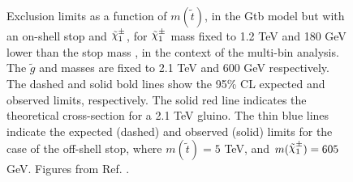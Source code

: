 \begin{figure}
  \centering
  \caption{Exclusion limits as a function of $m(\tilde{t})$, in the Gtb model but with an on-shell stop and $\chinoonepm$, 
  for $\chinoonepm$ mass fixed to 1.2 TeV  and 180 GeV lower than the stop mass ,
  in the context of the multi-bin analysis. The $\tilde{g}$ and \ninoone masses are fixed to 2.1 TeV and 600 GeV respectively.   
  The dashed and solid bold lines  show the 95\% CL expected and observed limits, respectively.    
  The solid red line indicates the theoretical cross-section for a 2.1 TeV gluino. 
  The thin blue lines indicate the expected (dashed) and observed (solid) limits for the case of the off-shell stop, where $m(\tilde{t}) = 5$ TeV, and $m(\chinoonepm) = 605$ GeV.
  Figures from Ref. \cite{ATLAS-CONF-2018-041}.}
  \label{fig:limits_GtbOnshell}
\end{figure}